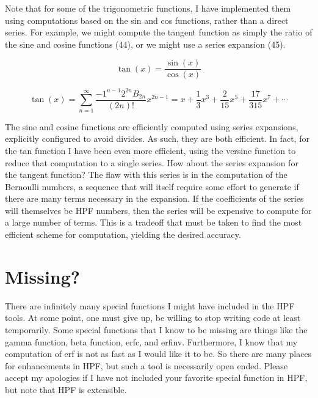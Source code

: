 \documentclass[a4paper,12pt]{article}
\begin{document}
Note that for some of the trigonometric functions, I have implemented them using computations based on the sin and cos functions, rather than a direct series. For example, we might compute the tangent function as simply the ratio of the sine and cosine functions (44), or we might use a series expansion (45).

\begin{equation}
   \tan(x) = \frac{\sin (x)}{\cos (x)}
\end{equation}

\begin{equation}
   \tan (x) = \sum_{n = 1}^{\infty}{\frac{-1^{n-1} 2^{2n} B_{2n}}{(2n)!}}x^{2n-1} = x + \frac{1}{3}x^{3} + \frac{2}{15}x^{5}  + \frac{17}{315}x^{7} + \cdots
\end{equation}

The sine and cosine functions are efficiently computed using series expansions, explicitly configured to avoid divides. As such, they are both efficient. In fact, for the tan function I have been even more efficient, using the versine function to reduce that computation to a single series. How about the series expansion for the tangent function? The flaw with this series is in the computation of the Bernoulli numbers, a sequence that will itself require some effort to generate if there are many terms necessary in the expansion. If the coefficients of the series will themselves be HPF numbers, then the series will be expensive to compute for a large number of terms. This is a tradeoff that must be taken to find the most efficient scheme for computation, yielding the desired accuracy.

\section{Missing?}

There are infinitely many special functions I might have included in the HPF tools. At some point, one must give up, be willing to stop writing code at least temporarily. Some special functions that I know to be missing are things like the gamma function, beta function, erfc, and erfinv. Furthermore, I know that my computation of erf is not as fast as I would like it to be. So there are many places for enhancements in HPF, but such a tool is necessarily open ended. Please accept my apologies if I have not included your favorite special function in HPF, but note that HPF is extensible.
\end{document}
